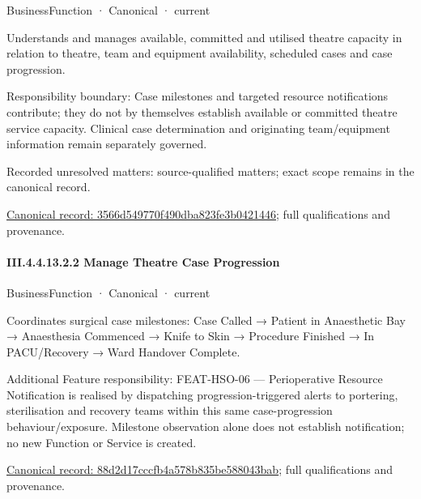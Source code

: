 \label{element:3566d549770f490dba823fe3b0421446}
{\small BusinessFunction · Canonical · current}\par

Understands and manages available, committed and utilised theatre capacity in relation to theatre, team and equipment availability, scheduled cases and case progression.



Responsibility boundary: Case milestones and targeted resource notifications contribute; they do not by themselves establish available or committed theatre service capacity. Clinical case determination and originating team/equipment information remain separately governed.


{\small Recorded unresolved matters: source-qualified matters; exact scope remains in the canonical record.}\par
{\footnotesize \href{../../../../continuum/business/business-function/3566d549770f490dba823fe3b0421446.md}{Canonical record: 3566d549770f490dba823fe3b0421446}; full qualifications and provenance.}\par
\paragraph*{III.4.4.13.2.2 Manage Theatre Case Progression}
\label{navigation:III.4.4.13.2.2}

\label{element:88d2d17cccfb4a578b835be588043bab}
{\small BusinessFunction · Canonical · current}\par

Coordinates surgical case milestones: Case Called → Patient in Anaesthetic Bay → Anaesthesia Commenced → Knife to Skin → Procedure Finished → In PACU/Recovery → Ward Handover Complete.



Additional Feature responsibility: FEAT-HSO-06 — Perioperative Resource Notification is realised by dispatching progression-triggered alerts to portering, sterilisation and recovery teams within this same case-progression behaviour/exposure. Milestone observation alone does not establish notification; no new Function or Service is created.


{\footnotesize \href{../../../../continuum/business/business-function/88d2d17cccfb4a578b835be588043bab.md}{Canonical record: 88d2d17cccfb4a578b835be588043bab}; full qualifications and provenance.}\par
